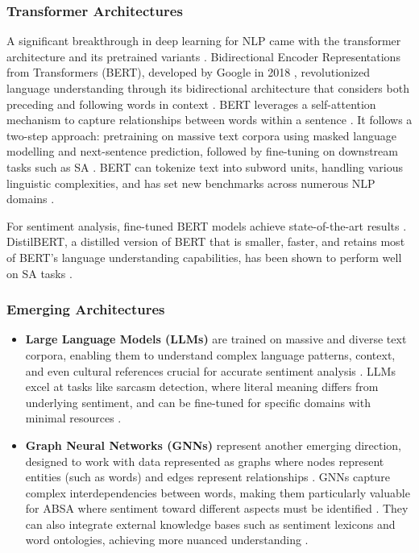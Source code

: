 \documentclass[a4paper,twoside,12pt]{book}
\begin{document}
\subsubsection{Transformer Architectures}

A significant breakthrough in deep learning for NLP came with the transformer architecture and its pretrained variants \cite{vaswani2017attention}. Bidirectional Encoder Representations from Transformers (BERT), developed by Google in 2018 \cite{Delvin2018bert}, revolutionized language understanding through its bidirectional architecture that considers both preceding and following words in context \cite{Delvin2018bert}. BERT leverages a self-attention mechanism to capture relationships between words within a sentence \cite{Delvin2018bert}. It follows a two-step approach: pretraining on massive text corpora using masked language modelling and next-sentence prediction, followed by fine-tuning on downstream tasks such as SA \cite{Delvin2018bert}. BERT can tokenize text into subword units, handling various linguistic complexities, and has set new benchmarks across numerous NLP domains \cite{Delvin2018bert}.

For sentiment analysis, fine-tuned BERT models achieve state-of-the-art results \cite{joshy2022analyzing}. DistilBERT, a distilled version of BERT that is smaller, faster, and retains most of BERT's language understanding capabilities, has been shown to perform well on SA tasks \cite{joshy2022analyzing}.

\subsubsection{Emerging Architectures}

\begin{itemize}
	\item \textbf{Large Language Models (LLMs)} are trained on massive and diverse text corpora, enabling them to understand complex language patterns, context, and even cultural references crucial for accurate sentiment analysis \cite{sharma2025review}. LLMs excel at tasks like sarcasm detection, where literal meaning differs from underlying sentiment, and can be fine-tuned for specific domains with minimal resources \cite{sharma2025review}.
	
	\item \textbf{Graph Neural Networks (GNNs)} represent another emerging direction, designed to work with data represented as graphs where nodes represent entities (such as words) and edges represent relationships \cite{sharma2025review}. GNNs capture complex interdependencies between words, making them particularly valuable for ABSA where sentiment toward different aspects must be identified \cite{sharma2025review}. They can also integrate external knowledge bases such as sentiment lexicons and word ontologies, achieving more nuanced understanding \cite{sharma2025review}.
\end{itemize}
\end{document}
